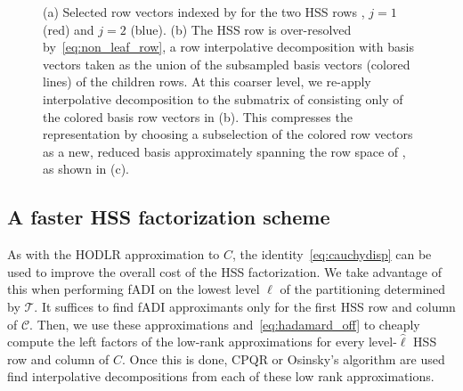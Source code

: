 \begin{figure}
\caption{ (a) Selected row vectors indexed by  for the two HSS rows ,  $j = 1$ (red) and $j = 2$ (blue).  (b) The HSS row  is over-resolved by~\eqref{eq:non_leaf_row}, a row interpolative decomposition with  basis vectors taken as the union of the subsampled basis vectors (colored lines) of the children rows.  At this coarser level, we re-apply  interpolative decomposition to the submatrix of  consisting only of the colored basis row vectors in (b). This compresses the representation  by choosing a subselection of the colored row vectors as a new, reduced basis approximately spanning the row space of , as shown in (c).}
\end{figure}


\subsection{A faster HSS factorization scheme}
\label{sec:cauchyhadamard}
As with the HODLR approximation to $C$, the identity~\eqref{eq:cauchydisp} can be used to improve the overall cost of the HSS factorization.  We take advantage of this when performing fADI on the lowest level $\hat \ell$ of the partitioning determined by $\mathcal T$. It suffices to find fADI approximants only for the first HSS row and column of $\mathscr{C}$.  Then, we use these approximations and~\eqref{eq:hadamard_off} to cheaply compute the left factors of the low-rank approximations for every level-$\hat \ell$ HSS row and column of $C$. Once this is done, CPQR or Osinsky's algorithm are used find interpolative decompositions from each of these low rank approximations. 

